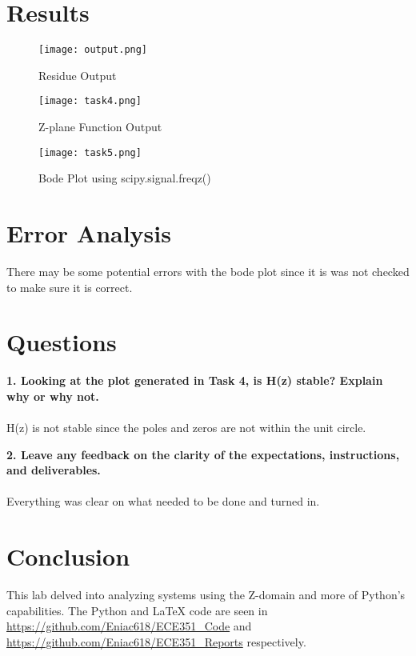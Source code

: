\documentclass[12pt]{report}
\begin{document}
\section{Results}

\begin{figure}[htp]
    \centering
    \texttt{[image: output.png]}
    \caption{Residue Output}
\end{figure}

\begin{figure}[htp]
    \centering
    \texttt{[image: task4.png]}
    \caption{Z-plane Function Output}
\end{figure}

\begin{figure}[htp]
    \centering
    \texttt{[image: task5.png]}
    \caption{Bode Plot using scipy.signal.freqz()}
\end{figure}

\pagebreak
\section{Error Analysis}
There may be some potential errors with the bode plot since it is was not checked to make sure it is correct.
\section{Questions}
\textbf{1. Looking at the plot generated in Task 4, is H(z) stable? Explain why or why not.} \\ \\
H(z) is not stable since the poles and zeros are not within the unit circle.

\textbf{2. Leave any feedback on the clarity of the expectations, instructions, and deliverables.} \\ \\
Everything was clear on what needed to be done and turned in.

\section{Conclusion}
This lab delved into analyzing systems using the Z-domain and more of Python's capabilities. The Python and \LaTeX{} code are seen in \url{https://github.com/Eniac618/ECE351_Code} and \url{https://github.com/Eniac618/ECE351_Reports} respectively.
\end{document}
